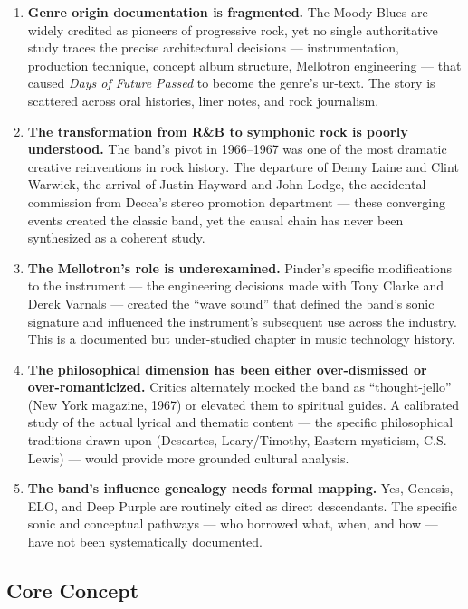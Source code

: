 \documentclass[11pt,letterpaper]{article}
\begin{document}
\begin{enumerate}[leftmargin=*, labelsep=1em]
  \item \textbf{Genre origin documentation is fragmented.} The Moody Blues are widely credited as pioneers of progressive rock, yet no single authoritative study traces the precise architectural decisions --- instrumentation, production technique, concept album structure, Mellotron engineering --- that caused \textit{Days of Future Passed} to become the genre's ur-text. The story is scattered across oral histories, liner notes, and rock journalism.
  
  \item \textbf{The transformation from R\&B to symphonic rock is poorly understood.} The band's pivot in 1966--1967 was one of the most dramatic creative reinventions in rock history. The departure of Denny Laine and Clint Warwick, the arrival of Justin Hayward and John Lodge, the accidental commission from Decca's stereo promotion department --- these converging events created the classic band, yet the causal chain has never been synthesized as a coherent study.
  
  \item \textbf{The Mellotron's role is underexamined.} Pinder's specific modifications to the instrument --- the engineering decisions made with Tony Clarke and Derek Varnals --- created the ``wave sound'' that defined the band's sonic signature and influenced the instrument's subsequent use across the industry. This is a documented but under-studied chapter in music technology history.
  
  \item \textbf{The philosophical dimension has been either over-dismissed or over-romanticized.} Critics alternately mocked the band as ``thought-jello'' (New York magazine, 1967) or elevated them to spiritual guides. A calibrated study of the actual lyrical and thematic content --- the specific philosophical traditions drawn upon (Descartes, Leary/Timothy, Eastern mysticism, C.S. Lewis) --- would provide more grounded cultural analysis.
  
  \item \textbf{The band's influence genealogy needs formal mapping.} Yes, Genesis, ELO, and Deep Purple are routinely cited as direct descendants. The specific sonic and conceptual pathways --- who borrowed what, when, and how --- have not been systematically documented.
\end{enumerate}

\subsection{Core Concept}
\end{document}
